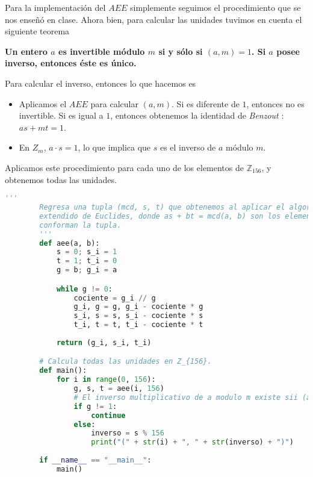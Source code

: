 \documentclass[letterpaper,10pt]{article}
\begin{document}
\begin{enumerate}
    Para la implementación del $AEE$ simplemente seguimos el procedimiento que
    se nos enseñó en clase. Ahora bien, para calcular las unidades tuvimos
    en cuenta el siguiente teorema
    \begin{center}
        \textbf{Un entero $a$ es invertible módulo $m$ si y sólo si 
        $(a,m) = 1$. Si $a$ posee inverso, entonces éste es único.}
    \end{center}
   
    Para calcular el inverso, entonces lo que hacemos es
    \begin{itemize}
        \item Aplicamos el $AEE$ para calcular $(a, m)$. Si es diferente de $1$,
        entonces no es invertible. Si es igual a $1$, entonces obtenemos la
        identidad de \textit{Benzout} : $as + mt = 1$.
        
        \item En $Z_{m}$, $a \cdot s = 1$, lo que implica que $s$ es el inverso
        de $a$ módulo $m$.
    \end{itemize}
    
    Aplicamos este procedimiento para cada uno de los elementos de 
    $\mathbb{Z}_{156}$, y obtenemos todas las unidades. 

    \begin{lstlisting}[language=Python]
        '''
        Regresa una tupla (mcd, s, t) que obtenemos al aplicar el algoritmo 
        extendido de Euclides, donde as + bt = mcd(a, b) son los elementos que 
        conforman la tupla.
        '''
        def aee(a, b):
            s = 0; s_i = 1
            t = 1; t_i = 0
            g = b; g_i = a

            while g != 0:
                cociente = g_i // g
                g_i, g = g, g_i - cociente * g
                s_i, s = s, s_i - cociente * s
                t_i, t = t, t_i - cociente * t
                
            return (g_i, s_i, t_i)

        # Calcula todas las unidades en Z_{156}.
        def main():
            for i in range(0, 156):
                g, s, t = aee(i, 156)
                # El inverso multiplicativo de a modulo m existe sii (a,m) = 1
                if g != 1:
                    continue 
                else:
                    inverso = s % 156
                    print("(" + str(i) + ", " + str(inverso) + ")")
            
        if __name__ == "__main__":
            main()
    \end{lstlisting}
    

\end{enumerate}
\end{document}
